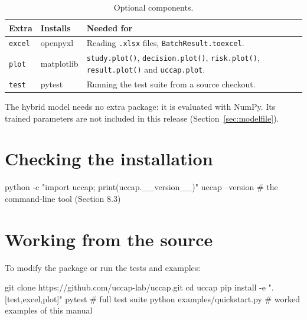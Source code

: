 \documentclass[a4paper,11pt,oneside,openany,parskip=half-,headings=standardclasses,toc=flat,numbers=noenddot]{scrbook}
\newcommand{\thead}[1]{{\sffamily\bfseries\footnotesize #1}}
\newcommand{\code}[1]{\texttt{\begingroup\def\_{\textunderscore\allowbreak}#1\endgroup}}
\newcommand{\secref}[1]{Section~\ref{#1}}
\begin{document}
\begin{table}[!htp]
\caption{Optional components.}
\small
\begin{tabularx}{\textwidth}{@{}P{10mm}P{17mm}L@{}}
\toprule
\thead{Extra} & \thead{Installs} & \thead{Needed for}\\
\midrule
\code{excel} & openpyxl & Reading \code{.xlsx} files, \code{BatchResult.to\_excel}.\\
\code{plot} & matplotlib & \code{study.plot()}, \code{decision.plot()}, \code{risk.plot()}, \code{result.plot()} and \code{uccap.plot}.\\
\code{test} & pytest & Running the test suite from a source checkout.\\
\bottomrule
\end{tabularx}
\end{table}

The hybrid model needs no extra package: it is evaluated with NumPy. Its trained parameters are not included in
this release (\secref{sec:modelfile}).

\section{Checking the installation}

\begin{shcode}
python -c "import uccap; print(uccap.__version__)"
uccap --version                     # the command-line tool (Section 8.3)
\end{shcode}

\section{Working from the source}
To modify the package or run the tests and examples:

\begin{shcode}
git clone https://github.com/uccap-lab/uccap.git
cd uccap
pip install -e ".[test,excel,plot]"
pytest                              # full test suite
python examples/quickstart.py       # worked examples of this manual
\end{shcode}
\end{document}
